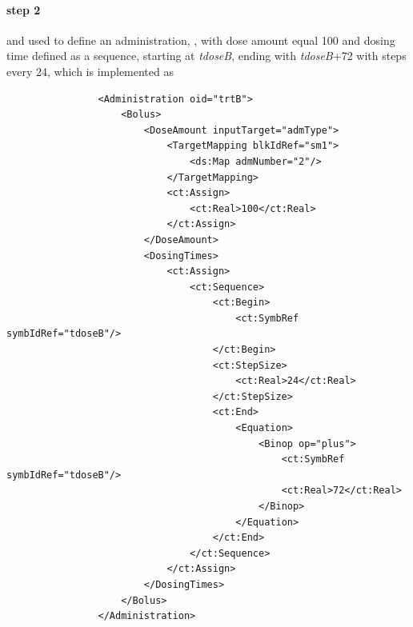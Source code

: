 \paragraph{step 2} and used to define an administration, , with dose amount equal 100 and
dosing time defined as a sequence, starting at \emph{tdoseB}, ending with \emph{tdoseB}+72
with steps every 24, which is implemented as
\lstset{language=XML}
\begin{lstlisting}
                <Administration oid="trtB">
                    <Bolus>
                        <DoseAmount inputTarget="admType">
                            <TargetMapping blkIdRef="sm1">
                                <ds:Map admNumber="2"/>
                            </TargetMapping>
                            <ct:Assign>
                                <ct:Real>100</ct:Real>
                            </ct:Assign>
                        </DoseAmount>
                        <DosingTimes>
                            <ct:Assign>
                                <ct:Sequence>
                                    <ct:Begin>
                                        <ct:SymbRef symbIdRef="tdoseB"/>
                                    </ct:Begin>
                                    <ct:StepSize>
                                        <ct:Real>24</ct:Real>
                                    </ct:StepSize>
                                    <ct:End>
                                        <Equation>
                                            <Binop op="plus">
                                                <ct:SymbRef symbIdRef="tdoseB"/>
                                                <ct:Real>72</ct:Real>
                                            </Binop>
                                        </Equation>
                                    </ct:End>
                                </ct:Sequence>
                            </ct:Assign>
                        </DosingTimes>
                    </Bolus>
                </Administration>
\end{lstlisting}

